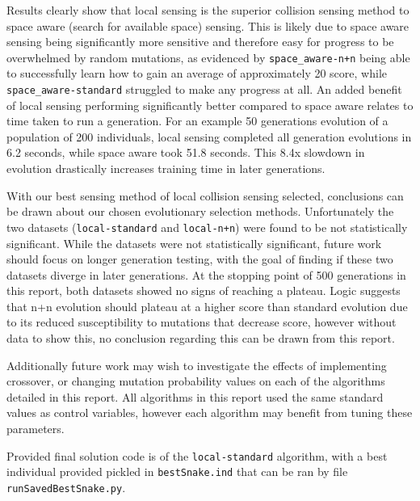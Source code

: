Results clearly show that local sensing is the superior collision sensing method to space aware (search for available space) sensing. This is likely due to space aware sensing being significantly more sensitive and therefore easy for progress to be overwhelmed by random mutations, as evidenced by \verb|space_aware-n+n| being able to successfully learn how to gain an average of approximately 20 score, while \verb|space_aware-standard| struggled to make any progress at all. An added benefit of local sensing performing significantly better compared to space aware relates to time taken to run a generation. For an example 50 generations evolution of a population of 200 individuals, local sensing completed all generation evolutions in 6.2 seconds, while space aware took 51.8 seconds. This 8.4x slowdown in evolution drastically increases training time in later generations.

With our best sensing method of local collision sensing selected, conclusions can be drawn about our chosen evolutionary selection methods. Unfortunately the two datasets (\verb|local-standard| and \verb|local-n+n|) were found to be not statistically significant. While the datasets were not statistically significant, future work should focus on longer generation testing, with the goal of finding if these two datasets diverge in later generations. At the stopping point of 500 generations in this report, both datasets showed no signs of reaching a plateau. Logic suggests that n+n evolution should plateau at a higher score than standard evolution due to its reduced susceptibility to mutations that decrease score, however without data to show this, no conclusion regarding this can be drawn from this report.

Additionally future work may wish to investigate the effects of implementing crossover, or changing mutation probability values on each of the algorithms detailed in this report. All algorithms in this report used the same standard values as control variables, however each algorithm may benefit from tuning these parameters.

Provided final solution code is of the \texttt{local-standard} algorithm, with a best individual provided pickled in \texttt{bestSnake.ind} that can be ran by file \texttt{runSavedBestSnake.py}.